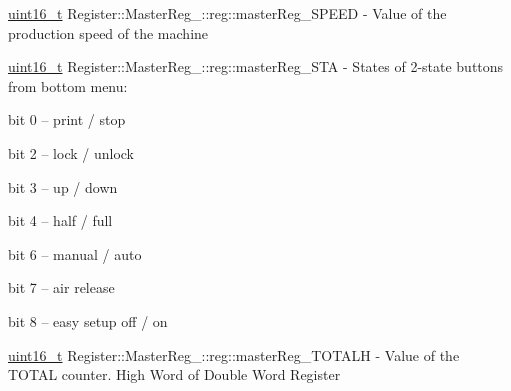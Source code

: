 \mbox{\label{structRegister_1_1MasterReg___1_1reg_ae2bc8af479ef3de52ea21d93678381b9}} 
{\footnotesize\ttfamily \mbox{\hyperlink{settings_8h_a017dd44e68049ffdd31500a8cd01ba68}{uint16\+\_\+t}} Register\+::\+Master\+Reg\+\_\+\+::reg\+::\texorpdfstring{master\+Reg\+\_\+\+S\+P\+E\+ED}{masterReg\_SPEED}} - Value of the production speed of the machine

\mbox{\label{structRegister_1_1MasterReg___1_1reg_a4e2d6361583dd5aebbfbf108e851db7c}} 
{\footnotesize\ttfamily \mbox{\hyperlink{settings_8h_a017dd44e68049ffdd31500a8cd01ba68}{uint16\+\_\+t}} Register\+::\+Master\+Reg\+\_\+\+::reg\+::\texorpdfstring{master\+Reg\+\_\+\+S\+TA}{masterReg\_STA}} - States of 2-state buttons from bottom menu:
\begin{DoxyCompactItemize}
\item bit 0 – print / stop
\item bit 2 – lock / unlock
\item bit 3 – up / down
\item bit 4 – half / full
\item bit 6 – manual / auto
\item bit 7 – air release
\item bit 8 – easy setup off / on
\end{DoxyCompactItemize}
\mbox{\label{structRegister_1_1MasterReg___1_1reg_a4078de112432b3218faa19e8c7b764ae}} 
{\footnotesize\ttfamily \mbox{\hyperlink{settings_8h_a017dd44e68049ffdd31500a8cd01ba68}{uint16\+\_\+t}} Register\+::\+Master\+Reg\+\_\+\+::reg\+::\texorpdfstring{master\+Reg\+\_\+\+T\+O\+T\+A\+LH}{masterReg\_TOTALH}} - Value of the TOTAL counter. High Word of Double Word Register

